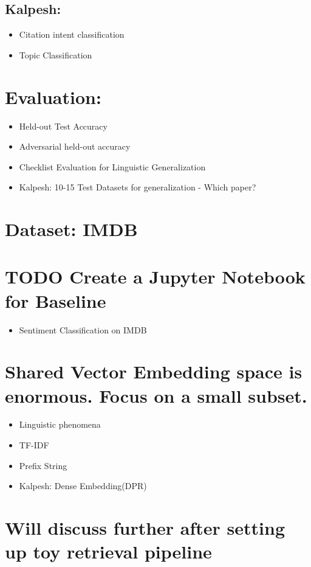 \documentclass[11pt]{article}
\begin{document}
\subsection{Kalpesh:}
\label{sec:org3fb8490}
\begin{itemize}
\item Citation intent classification
\item Topic Classification
\end{itemize}

\section{Evaluation:}
\label{sec:org92e193f}
\begin{itemize}
\item Held-out Test Accuracy
\item Adversarial held-out accuracy
\item Checklist Evaluation for Linguistic Generalization
\item Kalpesh: 10-15 Test Datasets for generalization - Which paper?
\end{itemize}

\section{Dataset: IMDB}
\label{sec:orgaaee572}
\section{{\bfseries\sffamily TODO} Create a Jupyter Notebook for Baseline}
\label{sec:org4ad8aa5}
\begin{itemize}
\item Sentiment Classification on IMDB
\end{itemize}
\section{Shared Vector Embedding space is enormous. Focus on a small subset.}
\label{sec:orgc8c117a}
\begin{itemize}
\item Linguistic phenomena
\item TF-IDF
\item Prefix String
\item Kalpesh: Dense Embedding(DPR)
\end{itemize}

\section{Will discuss further after setting up toy retrieval pipeline}
\label{sec:org07088de}
\end{document}
